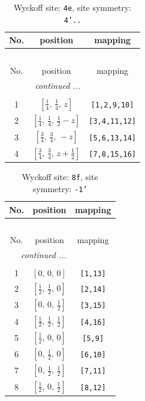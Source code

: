 \documentclass[fleqn,8pt]{jsarticle}
\begin{document}
\renewcommand{\arraystretch}{1.2}
\begin{longtable}{ccc}
\caption{Wyckoff site: {\tt 4e}, site symmetry: {\tt 4'..}}
 \\
 \hline \hline
No. & position & mapping \\ \hline \endfirsthead

\multicolumn{2}{l}{\tablename\ \thetable{}} \\
 \hline \hline
No. & position & mapping \\ \hline \endhead

 \hline \hline
\multicolumn{2}{r}{\footnotesize\it continued ...} \\ \endfoot

 \hline \hline
\multicolumn{2}{r}{} \\ \endlastfoot

1 & $\left[ \frac{1}{4},\, \frac{1}{4},\, z \right]$ & {\tt [1,2,9,10]} \\ \hline
2 & $\left[ \frac{1}{4},\, \frac{1}{4},\, \frac{1}{2} - z \right]$ & {\tt [3,4,11,12]} \\ \hline
3 & $\left[ \frac{3}{4},\, \frac{3}{4},\, - z \right]$ & {\tt [5,6,13,14]} \\ \hline
4 & $\left[ \frac{3}{4},\, \frac{3}{4},\, z + \frac{1}{2} \right]$ & {\tt [7,8,15,16]} \\
\end{longtable}
\renewcommand{\arraystretch}{1.2}
\begin{longtable}{ccc}
\caption{Wyckoff site: {\tt 8f}, site symmetry: {\tt -1'}}
 \\
 \hline \hline
No. & position & mapping \\ \hline \endfirsthead

\multicolumn{2}{l}{\tablename\ \thetable{}} \\
 \hline \hline
No. & position & mapping \\ \hline \endhead

 \hline \hline
\multicolumn{2}{r}{\footnotesize\it continued ...} \\ \endfoot

 \hline \hline
\multicolumn{2}{r}{} \\ \endlastfoot

1 & $\left[ 0,\, 0,\, 0 \right]$ & {\tt [1,13]} \\ \hline
2 & $\left[ \frac{1}{2},\, \frac{1}{2},\, 0 \right]$ & {\tt [2,14]} \\ \hline
3 & $\left[ 0,\, 0,\, \frac{1}{2} \right]$ & {\tt [3,15]} \\ \hline
4 & $\left[ \frac{1}{2},\, \frac{1}{2},\, \frac{1}{2} \right]$ & {\tt [4,16]} \\ \hline
5 & $\left[ \frac{1}{2},\, 0,\, 0 \right]$ & {\tt [5,9]} \\ \hline
6 & $\left[ 0,\, \frac{1}{2},\, 0 \right]$ & {\tt [6,10]} \\ \hline
7 & $\left[ 0,\, \frac{1}{2},\, \frac{1}{2} \right]$ & {\tt [7,11]} \\ \hline
8 & $\left[ \frac{1}{2},\, 0,\, \frac{1}{2} \right]$ & {\tt [8,12]} \\
\end{longtable}
\end{document}
